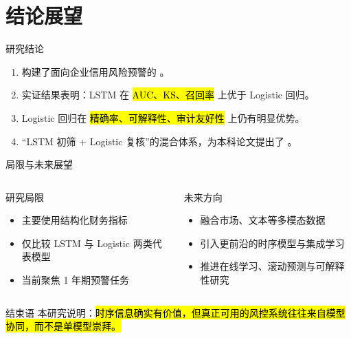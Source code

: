 \section{结论展望}

\begin{frame}{研究结论}
  \begin{enumerate}
    \item 构建了面向企业信用风险预警的 。
    \item 实证结果表明：LSTM 在 \hl{AUC、KS、召回率} 上优于 Logistic 回归。
    \item Logistic 回归在 \hl{精确率、可解释性、审计友好性} 上仍有明显优势。
    \item “LSTM 初筛 + Logistic 复核”的混合体系，为本科论文提出了 。
  \end{enumerate}
\end{frame}

\begin{frame}{局限与未来展望}
  \begin{columns}[T,onlytextwidth]
    \begin{block}{研究局限}
      \begin{itemize}
        \item 主要使用结构化财务指标
        \item 仅比较 LSTM 与 Logistic 两类代表模型
        \item 当前聚焦 1 年期预警任务
      \end{itemize}
    \end{block}

    \begin{exampleblock}{未来方向}
      \begin{itemize}
        \item 融合市场、文本等多模态数据
        \item 引入更前沿的时序模型与集成学习
        \item 推进在线学习、滚动预测与可解释性研究
      \end{itemize}
    \end{exampleblock}
  \end{columns}

  \vspace{0.6em}
  \begin{alertblock}{结束语}
    本研究说明：\hl{时序信息确实有价值，但真正可用的风控系统往往来自模型协同，而不是单模型崇拜。}
  \end{alertblock}
\end{frame}

